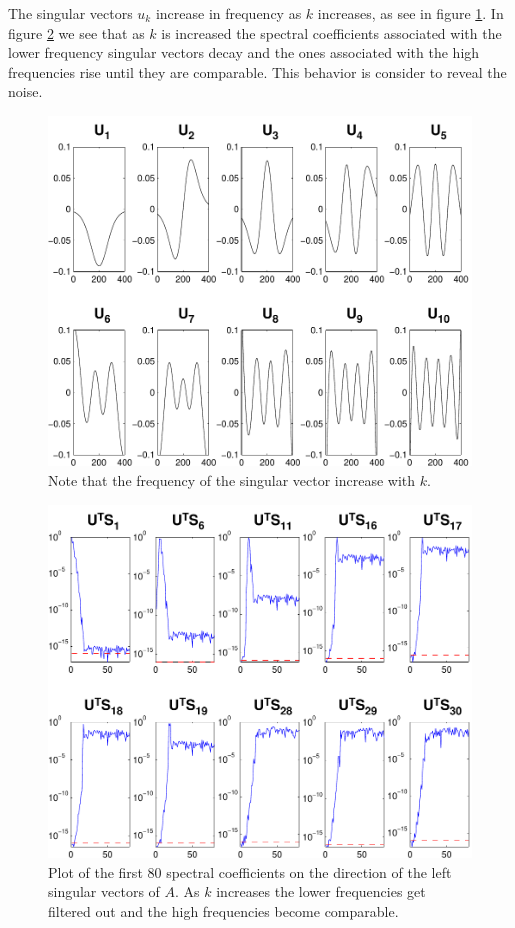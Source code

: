 \documentclass[11pt]{amsart}
\begin{document}
The singular vectors $u_{k}$ increase in frequency as $k$ increases, as 
see in figure \ref{fig:singularVectors}.
In figure \ref{fig:spectralCoeffs} we see that as $k$
is increased the spectral coefficients associated with the lower frequency 
singular vectors decay and the ones associated with the high frequencies rise 
until they are comparable. This behavior is consider to reveal the noise.
\begin{figure}[b] \label{fig:singularVectors}
  \begin{center}
    \includegraphics[width=0.55\linewidth]{figures/run1/sing_vecs}
  \end{center}
\caption{Note that the frequency of the singular vector increase with $k$.}
\end{figure}
\begin{figure}[htb] \label{fig:spectralCoeffs}
  \begin{center}
    \includegraphics[width=0.55\linewidth]{figures/run1/spec_sk}
  \end{center}
\caption{Plot of the first 80 spectral coefficients on the direction of the left
singular vectors of $A$. As $k$ increases the lower frequencies get filtered out
and the high frequencies become comparable.}
\end{figure}
\end{document}
